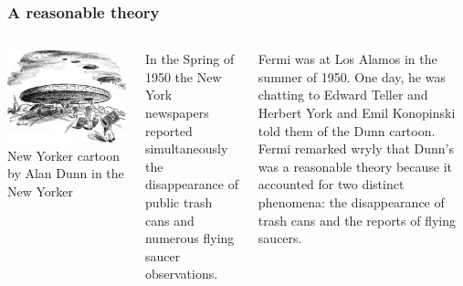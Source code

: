 
\begin{frame}
\frametitle{A reasonable theory}

\begin{columns}
\includegraphics[scale=0.3]{aliens}
New Yorker cartoon by Alan Dunn in the New Yorker


In the Spring of 1950 the New York newspapers reported simultaneously the disappearance of public trash cans and numerous flying saucer observations. 
\vspace{0.5cm}

Fermi was at Los Alamos in the summer of 1950. One day, he was chatting to Edward Teller and Herbert York and Emil Konopinski told them of the Dunn cartoon. Fermi remarked wryly that Dunn's was a reasonable theory because it accounted for two distinct phenomena: the disappearance of trash cans and the reports of flying saucers. 
\end{columns}
\end{frame}

